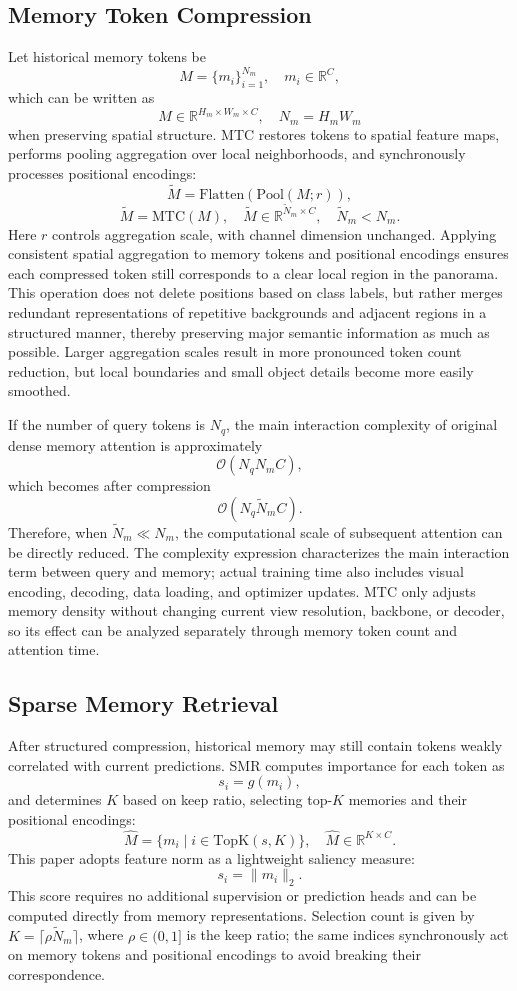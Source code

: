 \subsection{Memory Token Compression}
Let historical memory tokens be
\[
M=\{m_i\}_{i=1}^{N_m},\quad m_i\in\mathbb{R}^{C},
\]
which can be written as
\[
M\in\mathbb{R}^{H_m\times W_m\times C},\quad N_m=H_mW_m
\]
when preserving spatial structure. MTC restores tokens to spatial feature maps, performs pooling aggregation over local neighborhoods, and synchronously processes positional encodings:
\[
\tilde{M}=\mathrm{Flatten}(\mathrm{Pool}(M;r)),
\]
\[
\tilde{M}=\mathrm{MTC}(M),\quad
\tilde{M}\in\mathbb{R}^{\tilde{N}_m\times C},\quad
\tilde{N}_m<N_m.
\]
Here $r$ controls aggregation scale, with channel dimension unchanged. Applying consistent spatial aggregation to memory tokens and positional encodings ensures each compressed token still corresponds to a clear local region in the panorama. This operation does not delete positions based on class labels, but rather merges redundant representations of repetitive backgrounds and adjacent regions in a structured manner, thereby preserving major semantic information as much as possible. Larger aggregation scales result in more pronounced token count reduction, but local boundaries and small object details become more easily smoothed.

If the number of query tokens is $N_q$, the main interaction complexity of original dense memory attention is approximately
\[
\mathcal{O}(N_qN_mC),
\]
which becomes after compression
\[
\mathcal{O}(N_q\tilde{N}_mC).
\]
Therefore, when $\tilde{N}_m\ll N_m$, the computational scale of subsequent attention can be directly reduced. The complexity expression characterizes the main interaction term between query and memory; actual training time also includes visual encoding, decoding, data loading, and optimizer updates. MTC only adjusts memory density without changing current view resolution, backbone, or decoder, so its effect can be analyzed separately through memory token count and attention time.

\subsection{Sparse Memory Retrieval}
After structured compression, historical memory may still contain tokens weakly correlated with current predictions. SMR computes importance for each token as
\[
s_i=g(m_i),
\]
and determines $K$ based on keep ratio, selecting top-$K$ memories and their positional encodings:
\[
\hat{M}=\{m_i\mid i\in\mathrm{TopK}(s,K)\},\quad
\hat{M}\in\mathbb{R}^{K\times C}.
\]
This paper adopts feature norm as a lightweight saliency measure:
\[
s_i=\lVert m_i\rVert_2.
\]
This score requires no additional supervision or prediction heads and can be computed directly from memory representations. Selection count is given by $K=\lceil\rho\tilde{N}_m\rceil$, where $\rho\in(0,1]$ is the keep ratio; the same indices synchronously act on memory tokens and positional encodings to avoid breaking their correspondence.

